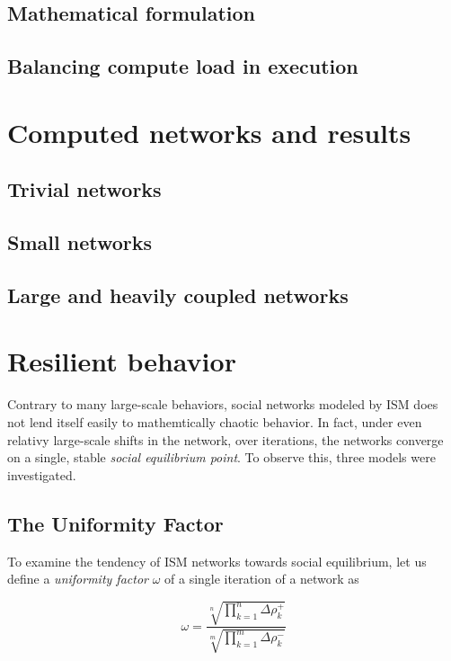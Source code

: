 \documentclass[12pt]{article}
\begin{document}
\subsection{Mathematical formulation}

\subsection{Balancing compute load in execution}

\section{Computed networks and results}

\subsection{Trivial networks}

\subsection{Small networks}

\subsection{Large and heavily coupled networks}

\section{Resilient behavior}

Contrary to many large-scale behaviors, social networks modeled by ISM does not lend itself easily to mathemtically chaotic behavior. In fact, under even relativy large-scale shifts in the network, over iterations, the networks converge on a single, stable \textit{social equilibrium point}. To observe this, three models were investigated.

\subsection{The Uniformity Factor}

To examine the tendency of ISM networks towards social equilibrium, let us define a \textit{uniformity factor} $\omega$ of a single iteration of a network as

\begin{equation}
\omega = \frac{\sqrt[n]{\prod^n_{k=1} \Delta \rho^+_k}}{\sqrt[m]{\prod^m_{k=1} \Delta \rho^-_k}}
\end{equation}
\end{document}
